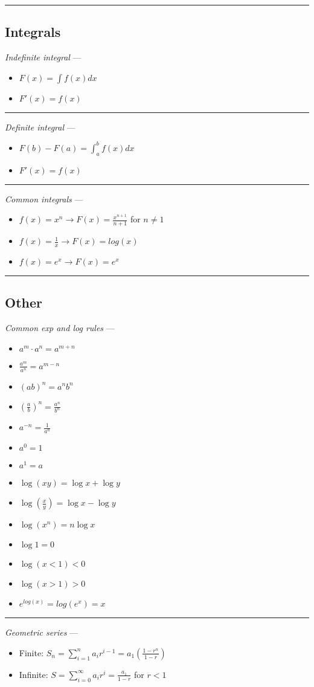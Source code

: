 {\color{black}\hrule height 0.001mm}

\subsection*{Integrals}
\emph{Indefinite integral} --- 
\begin{itemize}
    \item $F(x) = \int f(x) dx$
    \item $F'(x) = f(x)$
\end{itemize}

{\color{lightgray}\hrule height 0.001mm}

\emph{Definite integral} --- 
\begin{itemize}
    \item $F(b) - F(a) = \int_a^b f(x) dx$
    \item $F'(x) = f(x)$
\end{itemize}

{\color{lightgray}\hrule height 0.001mm}

\emph{Common integrals} --- 
\begin{itemize}
    \item $f(x) = x^n \rightarrow F(x) = \frac{x^{n+1}}{n+1}$ for $n \neq 1$
    \item $f(x) = \frac{1}{x} \rightarrow F(x) = log(x)$
    \item $f(x) = e^x \rightarrow F(x) = e^x$
\end{itemize}

{\color{black}\hrule height 0.001mm}

\subsection*{Other}
\emph{Common exp and log rules} ---
\begin{multicols}{2}
\begin{itemize}
    \item $a^m \cdot a^n = a^{m+n}$
    \item $\frac{a^m}{a^n} = a^{m-n}$
    \item $(ab)^n = a^n b^n$
    \item $\left(\frac{a}{b}\right)^n = \frac{a^n}{b^n}$
    \item $a^{-n} = \frac{1}{a^n}$
    \item $a^0 = 1$
    \item $a^1 = a$
    \item $\log(xy) = \log x + \log y$
    \item $\log\left(\frac{x}{y}\right) = \log x - \log y$
    \item $\log(x^n) = n \log x$
    \item $\log 1 = 0$
    \item $\log (x<1) < 0$
    \item $\log (x>1) > 0$
    \item $e^{log(x)} = log(e^x) = x$
\end{itemize}
\end{multicols}

{\color{lightgray}\hrule height 0.001mm}
\emph{Geometric series} --- 
\begin{itemize}
    \item Finite: $S_n = \sum_{i=1}^n a_i r^{i-1} = a_1 (\frac{1-r^n}{1-r})$
    \item Infinite: $S = \sum_{i=0}^\infty a_i r^i = \frac{a_1}{1-r}$ for $r < 1$
\end{itemize}